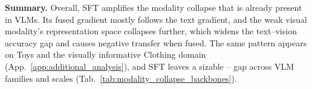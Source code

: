 \vspace{+0.1cm}
\noindent\textbf{Summary.}
Overall, SFT amplifies the modality collapse that is already present in VLMs.
Its fused gradient mostly follows the text gradient, and the weak visual modality's representation space collapses further, which widens the text--vision accuracy gap and causes negative transfer when fused.
The same pattern appears on Toys and the visually informative Clothing domain (App.~\ref{app:additional_analysis}), and SFT leaves a sizable \TEXTset{}--\VISIONset{} gap across VLM families and scales (Tab.~\ref{tab:modality_collapse_backbones}).